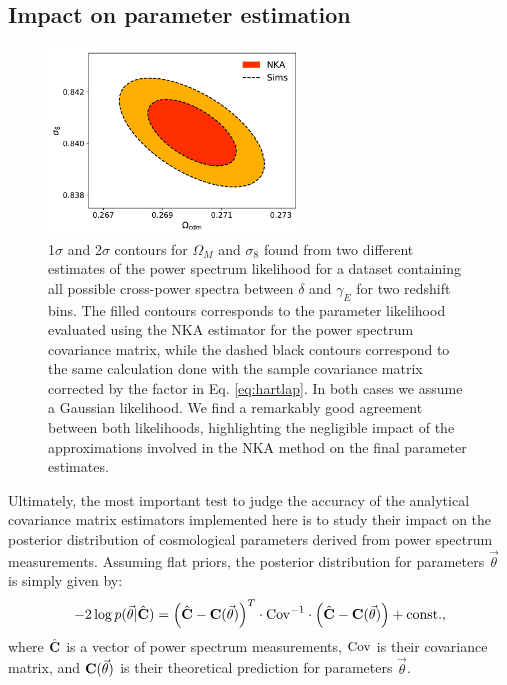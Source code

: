\documentclass[a4paper,11pt]{article}
\begin{document}
    \subsection{Impact on parameter estimation}\label{ssec:results.cosmo}
      \begin{figure}
        \centering
        \includegraphics[width=0.6\textwidth]{./figures/contours_2bin.pdf}
        \caption{1$\sigma$ and 2$\sigma$ contours for $\Omega_M$ and $\sigma_8$ found from two different estimates of the power spectrum likelihood for a dataset containing all possible cross-power spectra between $\delta$ and $\gamma_E$ for two redshift bins. The filled contours corresponds to the parameter likelihood evaluated using the NKA estimator for the power spectrum covariance matrix, while the dashed black contours correspond to the same calculation done with the sample covariance matrix corrected by the factor in Eq. \ref{eq:hartlap}. In both cases we assume a Gaussian likelihood. We find a remarkably good agreement between both likelihoods, highlighting the negligible impact of the approximations involved in the NKA method on the final parameter estimates.} \label{fig:contours}
      \end{figure}
      Ultimately, the most important test to judge the accuracy of the analytical covariance matrix estimators implemented here is to study their impact on the posterior distribution of cosmological parameters derived from power spectrum measurements. Assuming flat priors, the posterior distribution for parameters $\vec{\theta}$ is simply given by:
      \begin{equation}\label{eq:parpos}
        -2\log p(\vec{\theta}|\hat{\bf C})=\left(\hat{\bf C}-{\bf C}(\vec{\theta})\right)^T\cdot{\rm Cov}^{-1}\cdot\left(\hat{\bf C}-{\bf C}(\vec{\theta})\right)+{\rm const.},
      \end{equation}
      where $\hat{\bf C}$ is a vector of power spectrum measurements, ${\rm Cov}$ is their covariance matrix, and ${\bf C}(\vec{\theta})$ is their theoretical prediction for parameters $\vec{\theta}$.
\end{document}

